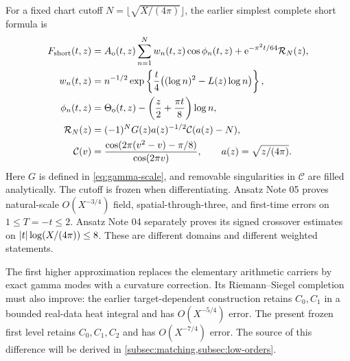 For a fixed chart cutoff \(N=\lfloor\sqrt{X/(4\pi)}\rfloor\), the
earlier simplest complete short formula is
\begin{subequations}\label{eq:short}
\begin{align}
 F_{\mathrm{short}}(t,z)
 &=A_{\mathrm o}(t,z)\sum_{n=1}^{N}w_n(t,z)\cos\phi_n(t,z)
       +\mathrm e^{-\pi^2t/64}\mathcal R_N(z),\\
 w_n(t,z)&=n^{-1/2}
     \exp\left\{\frac t4\bigl((\log n)^2-L(z)\log n\bigr)\right\},\\
 \phi_n(t,z)&=\Theta_{\mathrm o}(t,z)
                  -\left(\frac z2+\frac{\pi t}{8}\right)\log n,\\
 \mathcal R_N(z)&=(-1)^NG(z)a(z)^{-1/2}\mathcal C(a(z)-N),\\
 \mathcal C(v)&=\frac{\cos(2\pi(v^2-v)-\pi/8)}{\cos(2\pi v)},
 \qquad a(z)=\sqrt{z/(4\pi)}.
\end{align}
\end{subequations}
Here \(G\) is defined in \cref{eq:gamma-scale}, and removable
singularities in \(\mathcal C\) are filled analytically.
The cutoff is frozen when differentiating. Ansatz Note 05 proves
natural-scale \(O(X^{-3/4})\) field, spatial-through-three, and
first-time errors on \(1\le T=-t\le2\).
Ansatz Note 04 separately proves its signed crossover estimates on
\(\lvert t\rvert\log(X/(4\pi))\le8\). These are different domains and
different weighted statements.

The first higher approximation replaces the elementary arithmetic
carriers by exact gamma modes with a curvature correction. Its
Riemann--Siegel completion must also improve: the earlier
target-dependent construction retains \(C_0,C_1\) in a bounded
real-data heat integral and has \(O(X^{-5/4})\) error. The present
frozen first level retains \(C_0,C_1,C_2\) and has
\(O(X^{-7/4})\) error. The source of this difference will be
derived in \cref{subsec:matching,subsec:low-orders}.

